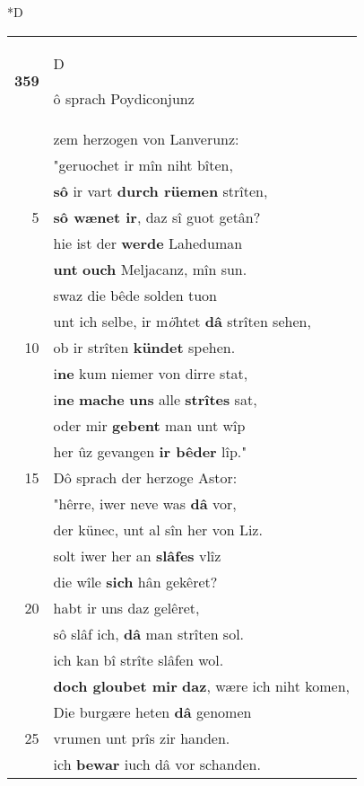 \documentclass[8pt,a4paper,notitlepage]{article}
\begin{document}
\begin{table}[ht]
\begin{minipage}[t]{0.5\linewidth}
\small
\begin{center}*D
\end{center}
\begin{tabular}{rl}
\textbf{359} & \begin{large}D\end{large}ô sprach Poydiconjunz\\ 
 & zem herzogen von Lanverunz:\\ 
 & "geruochet ir mîn niht bîten,\\ 
 & \textbf{sô} ir vart \textbf{durch rüemen} strîten,\\ 
5 & \textbf{sô wænet ir}, daz sî guot getân?\\ 
 & hie ist der \textbf{werde} Laheduman\\ 
 & \textbf{unt} \textbf{ouch} Meljacanz, mîn sun.\\ 
 & swaz die bêde solden tuon\\ 
 & unt ich selbe, ir m\textit{ö}htet \textbf{dâ} strîten sehen,\\ 
10 & ob ir strîten \textbf{kündet} spehen.\\ 
 & i\textbf{ne} kum niemer von dirre stat,\\ 
 & i\textbf{ne} \textbf{mache} \textbf{uns} alle \textbf{strîtes} sat,\\ 
 & oder mir \textbf{gebent} man unt wîp\\ 
 & her ûz gevangen \textbf{ir bêder} lîp."\\ 
15 & Dô sprach der herzoge Astor:\\ 
 & "hêrre, iwer neve was \textbf{dâ} vor,\\ 
 & der künec, unt al sîn her von Liz.\\ 
 & solt iwer her an \textbf{slâfes} vlîz\\ 
 & die wîle \textbf{sich} hân gekêret?\\ 
20 & habt ir uns daz gelêret,\\ 
 & sô slâf ich, \textbf{dâ} man strîten sol.\\ 
 & ich kan bî strîte slâfen wol.\\ 
 & \textbf{doch gloubet mir} \textbf{daz}, wære ich niht komen,\\ 
 & Die burgære heten \textbf{dâ} genomen\\ 
25 & vrumen unt prîs zir handen.\\ 
 & ich \textbf{bewar} iuch dâ vor schanden.\\ 

\end{tabular}
\end{minipage}
\end{table}
\end{document}
